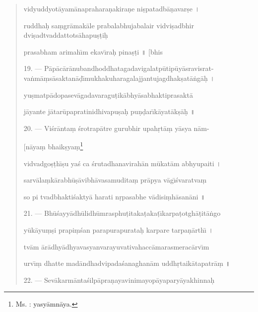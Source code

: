 \documentclass[a4paper, 11pt, oneside, french]{article}
\begin{document}
\begin{quotation}
vidyuddyot\={a}yam\={a}naprahara\d{n}akira\d{n}e ni\d{s}patadb\={a}\d{n}avar\d{s}e \texthindi{।}

ruddha\d{h} sa\d{m}gr\={a}mak\={a}le prabalabhujabalair vidvi\d{s}adbhir dvi\d{s}adtvaddattots\={a}hapu\d{s}\d{t}i\d{h}

prasabham arimah\={\i}m ekav\={\i}ra\d{h} pina\d{s}\d{t}i \texthindi{॥} [bhis

\bigskip

19. --- P\={a}p\={a}c\={a}r\={a}nubandhoddhatagadavigalatp\={u}tip\={u}y\={a}sravisrat-
va\.{n}m\={a}\d{m}s\={a}saktan\={a}\d{d}\={\i}mukhakuharagalajjantujagdhak\d{s}at\={a}\.{n}g\={a}\d{h} \texthindi{।}

yu\d{s}matp\={a}dopasev\={a}gadavaragu\d{t}ik\={a}bhy\={a}sabhaktiprasakt\={a}

j\={a}yante j\={a}tar\={u}papratinidhivapu\d{s}a\d{h} pu\d{n}\d{d}ar\={\i}k\={a}yat\={a}k\d{s}\={a}\d{h} \texthindi{॥}

\bigskip

20. --- Vi\'{s}r\={a}nta\d{m} \'{s}rotrap\={a}tre gurubhir upah\d{r}t\={a}\d{m} y\={a}sya n\={a}m-

\hspace*{85mm}[n\={a}ya\d{m} bhaik\d{s}ya\d{m}\footnote{Ms. : yasy\={a}mn\={a}ya.}

vidvadgo\d{s}\d{t}h\={\i}\d{s}u ya\'{s} ca \'{s}rutadhanavirah\={a}n m\={u}kat\={a}m abhyupaiti \texthindi{।}

sarv\={a}la\d{m}k\={a}rabh\={u}\d{s}\={a}vibh\={a}vasamudita\d{m} pr\={a}pya v\={a}g\={\i}\'{s}varatva\d{m}

so pi tvadbhakti\'{s}akty\={a} harati n\d{r}pasabhe v\={a}disi\d{m}h\={a}san\={a}ni \texthindi{॥}

\bigskip

21. --- Bh\={u}\'{s}ayy\={a}dh\={u}lidh\={u}mrasphu\d{t}itaka\d{t}aka\d{t}\={\i}karpa\d{t}otgh\={a}\d{t}it\={a}\.{n}go

y\={u}k\={a}yu\d{m}\d{s}i prapi\d{m}\'{s}an parapurapurata\d{h} karpare tarpa\d{n}\={a}rth\={\i} \texthindi{।}

tv\={a}m \={a}r\={a}dhy\={a}dhyavasyanvarayuvativahacc\={a}marasmerac\={a}rv\={\i}m

urv\={\i}\d{m} dhatte mad\={a}ndhadvipada\'{s}anaghan\={a}m uddh\d{r}taik\={a}tapatr\={a}\d{m} \texthindi{॥}

\bigskip

22. --- Sev\={a}karm\={a}nta\'{s}ilp\={a}pra\d{n}ayavinimayop\={a}yapary\={a}yakhinna\d{h}


\end{quotation}
\end{document}
